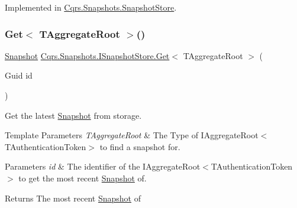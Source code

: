 Implemented in \hyperlink{classCqrs_1_1Snapshots_1_1SnapshotStore_a08ec0d8ff97742e3503a3778bb92076e_a08ec0d8ff97742e3503a3778bb92076e}{Cqrs.\+Snapshots.\+Snapshot\+Store}.

\mbox{\label{interfaceCqrs_1_1Snapshots_1_1ISnapshotStore_ab7bd163fc9cd5c3bd5911679030be403_ab7bd163fc9cd5c3bd5911679030be403}} 
\subsubsection{\texorpdfstring{Get$<$ T\+Aggregate\+Root $>$()}{Get< TAggregateRoot >()}}
{\footnotesize\ttfamily \hyperlink{classCqrs_1_1Snapshots_1_1Snapshot}{Snapshot} \hyperlink{interfaceCqrs_1_1Snapshots_1_1ISnapshotStore_a25efb06a4a6fcc9246d4572777c95dd5_a25efb06a4a6fcc9246d4572777c95dd5}{Cqrs.\+Snapshots.\+I\+Snapshot\+Store.\+Get}$<$ T\+Aggregate\+Root $>$ (\begin{DoxyParamCaption}\item[{Guid}]{id }\end{DoxyParamCaption})}



Get the latest \hyperlink{classCqrs_1_1Snapshots_1_1Snapshot}{Snapshot} from storage. 


\begin{DoxyTemplParams}{Template Parameters}
{\em T\+Aggregate\+Root} & The Type of I\+Aggregate\+Root$<$\+T\+Authentication\+Token$>$ to find a snapshot for.\\
\hline
\end{DoxyTemplParams}

\begin{DoxyParams}{Parameters}
{\em id} & The identifier of the I\+Aggregate\+Root$<$\+T\+Authentication\+Token$>$ to get the most recent \hyperlink{classCqrs_1_1Snapshots_1_1Snapshot}{Snapshot} of.\\
\hline
\end{DoxyParams}
\begin{DoxyReturn}{Returns}
The most recent \hyperlink{classCqrs_1_1Snapshots_1_1Snapshot}{Snapshot} of
\end{DoxyReturn}


